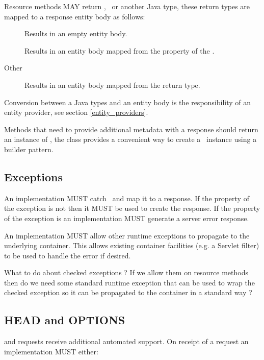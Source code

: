 Resource methods MAY return , \Response\ or another Java type, these return types are mapped to a response entity body as follows:

\begin{description}
\item[] Results in an empty entity body.
\item[\Response] Results in an entity body mapped from the  property of the \Response.
\item[Other] Results in an entity body mapped from the return type.
\end{description}

Conversion between a Java types and an entity body is the responsibility of an entity provider, see section \ref{entity_providers}.

Methods that need to provide additional metadata with a response should return an instance of \Response, the \Response{} class provides a convenient way to create a \Response\ instance using a builder pattern.

\subsection{Exceptions}

An implementation MUST catch \WebAppExc\ and map it to a response. If the  property of the exception is not  then it MUST be used to create the response. If the  property of the exception is  an implementation MUST generate a server error response.

An implementation MUST allow other runtime exceptions to propagate to the underlying container. This allows existing container facilities (e.g. a Servlet filter) to be used to handle the error if desired.

\begin{ednote}What to do about checked exceptions ? If we allow them on resource methods then do we need some standard runtime exception that can be used to wrap the checked exception so it can be propagated to the container in a standard way ?\end{ednote}

\subsection{HEAD and OPTIONS}
\label{head_and_options}

 and  requests receive additional automated support. On receipt of a request an implementation MUST either:

